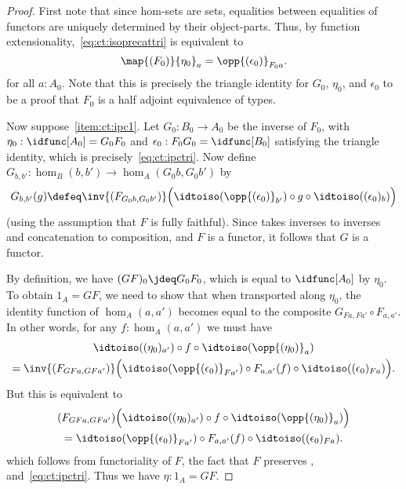 \begin{proof}
  First note that since hom-sets are sets, equalities between equalities of functors are uniquely determined by their object-parts.
  Thus, by function extensionality,~\eqref{eq:ct:isoprecattri} is equivalent to
  \begin{equation}
    \map{(F_0)}{\eta_0}_a = \opp{(\epsilon_0)}_{F_0 a}.\label{eq:ct:ipctri}
  \end{equation}
  for all $a:A_0$.
  Note that this is precisely the triangle identity for $G_0$, $\eta_0$, and $\epsilon_0$ to be a proof that $F_0$ is a half adjoint equivalence of types.

  Now suppose~\ref{item:ct:ipc1}.
  Let $G_0:B_0 \to A_0$ be the inverse of $F_0$, with $\eta_0: \idfunc[A_0] = G_0 F_0$ and $\epsilon_0:F_0G_0 = \idfunc[B_0]$ satisfying the triangle identity, which is precisely~\eqref{eq:ct:ipctri}.
  Now define $G_{b,b'}:\hom_B(b,b') \to \hom_A(G_0b,G_0b')$ by
  \[ G_{b,b'}(g) \defeq
  \inv{(F_{G_0b,G_0b'})}\Big(\idtoiso(\opp{(\epsilon_0)}_{b'}) \circ g \circ \idtoiso((\epsilon_0)_b)\Big)
  \]
  (using the assumption that $F$ is fully faithful).
  Since \idtoiso takes inverses to inverses and concatenation to composition, and $F$ is a functor, it follows that $G$ is a functor.

  By definition, we have $(GF)_0 \jdeq G_0 F_0$, which is equal to $\idfunc[A_0]$ by $\eta_0$.
  To obtain $1_A = GF$, we need to show that when transported along $\eta_0$, the identity function of $\hom_A(a,a')$ becomes equal to the composite $G_{Fa,Fa'} \circ F_{a,a'}$.
  In other words, for any $f:\hom_A(a,a')$ we must have
  \begin{multline*}
    \idtoiso((\eta_0)_{a'}) \circ f \circ \idtoiso(\opp{(\eta_0)}_a)\\
    = \inv{(F_{GFa,GFa'})}\Big(\idtoiso(\opp{(\epsilon_0)}_{Fa'})
    \circ F_{a,a'}(f) \circ \idtoiso((\epsilon_0)_{Fa})\Big).
  \end{multline*}
  But this is equivalent to
  \begin{multline*}
    (F_{GFa,GFa'})\Big(\idtoiso((\eta_0)_{a'}) \circ f \circ \idtoiso(\opp{(\eta_0)}_a)\Big)\\
    = \idtoiso(\opp{(\epsilon_0)}_{Fa'})
    \circ F_{a,a'}(f) \circ \idtoiso((\epsilon_0)_{Fa}).
  \end{multline*}
  which follows from functoriality of $F$, the fact that $F$ preserves \idtoiso, and~\eqref{eq:ct:ipctri}.
  Thus we have $\eta:1_A = GF$.


\end{proof}
